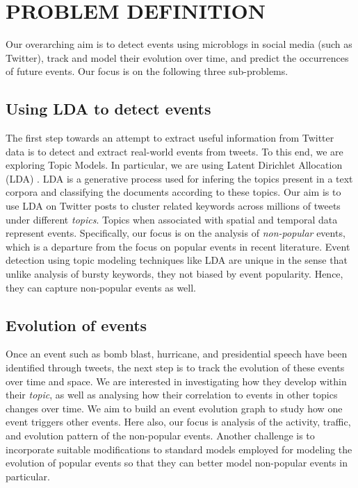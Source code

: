 \section{\uppercase{Problem Definition}}
Our overarching aim is to detect events using microblogs in social media (such as Twitter), track and model their evolution over time, and predict the occurrences of future events. Our focus is on the following three sub-problems.

\subsection{Using LDA to detect events}
The first step towards an attempt to extract useful information from Twitter data is to detect and extract real-world events from tweets. To this end, we are exploring Topic Models. In particular, we are using Latent Dirichlet Allocation (LDA) \cite{blei2003latent}. LDA is a generative process used for infering the topics present in a text corpora and classifying the documents according to these topics. Our aim is to use LDA on Twitter posts to cluster related keywords across millions of tweets under different \emph{topics}. Topics when associated with spatial and temporal data represent events. Specifically, our focus is on the analysis of \emph{non-popular} events, which is a departure from the focus on popular events in recent literature. Event detection using topic modeling techniques like LDA are unique in the sense that unlike analysis of bursty keywords, they not biased by event popularity. Hence, they can capture non-popular events as well.

\subsection{Evolution of events}
Once an event such as bomb blast, hurricane, and presidential speech have been identified through tweets, the next step is to track the evolution of these events over time and space. We are interested in investigating how they develop within their \emph{topic}, as well as analysing how their correlation to events in other topics changes over time. We aim to build an event evolution graph to study how one event triggers other events. Here also, our focus is analysis  of the activity, traffic, and evolution pattern of the non-popular events. Another challenge is to incorporate suitable modifications to standard models employed for modeling the evolution of popular events \cite{lin2010pet} so that they can better model non-popular events in particular.

